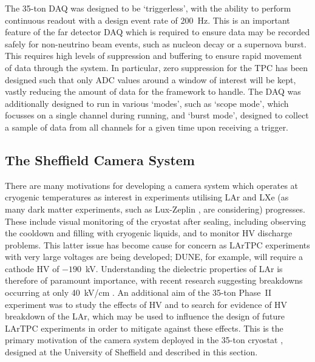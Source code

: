The 35-ton DAQ was designed to be `triggerless', with the ability to perform continuous readout with a design event rate of 200~Hz.  This is an important feature of the far detector DAQ which is required to ensure data may be recorded safely for non-neutrino beam events, such as nucleon decay or a supernova burst.  This requires high levels of suppression and buffering to ensure rapid movement of data through the system.  In particular, zero suppression for the TPC has been designed such that only ADC values around a window of interest will be kept, vastly reducing the amount of data for the framework to handle.  The DAQ was additionally designed to run in various `modes', such as `scope mode', which focusses on a single channel during running, and `burst mode', designed to collect a sample of data from all channels for a given time upon receiving a trigger.

\subsection{The Sheffield Camera System}\label{sec:SheffieldCameras}

There are many motivations for developing a camera system which operates at cryogenic temperatures as interest in experiments utilising LAr and LXe (as many dark matter experiments, such as Lux-Zeplin \cite{LZCDR2015}, are considering) progresses.  These include visual monitoring of the cryostat after sealing, including observing the cooldown and filling with cryogenic liquids, and to monitor HV discharge problems.  This latter issue has become cause for concern as LArTPC experiments with very large voltages are being developed; DUNE, for example, will require a cathode HV of $-190$~kV.  Understanding the dielectric properties of LAr is therefore of paramount importance, with recent research suggesting breakdowns occurring at only 40~kV/cm \cite{Blatter2014}.  An additional aim of the 35-ton Phase~II experiment was to study the effects of HV and to search for evidence of HV breakdown of the LAr, which may be used to influence the design of future LArTPC experiments in order to mitigate against these effects.  This is the primary motivation of the camera system deployed in the 35-ton cryostat \cite{35tonCameras2017}, designed at the University of Sheffield and described in this section.

